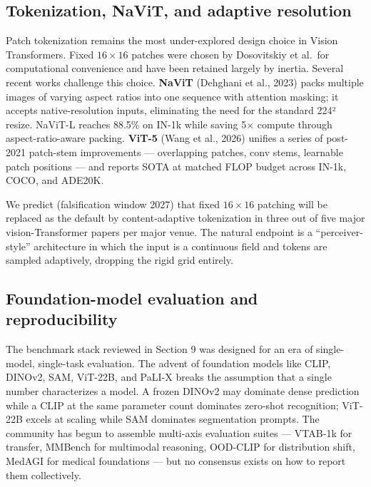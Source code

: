 \subsection{Tokenization, NaViT, and adaptive resolution}\label{tokenization-navit-and-adaptive-resolution}

Patch tokenization remains the most under-explored design choice in Vision Transformers. Fixed \(16 \times 16\) patches were chosen by Dosovitskiy et al.~for computational convenience and have been retained largely by inertia. Several recent works challenge this choice. \textbf{NaViT} (Dehghani et al., 2023) packs multiple images of varying aspect ratios into one sequence with attention masking; it accepts native-resolution inputs, eliminating the need for the standard 224² resize. NaViT-L reaches 88.5\% on IN-1k while saving 5× compute through aspect-ratio-aware packing. \textbf{ViT-5} (Wang et al., 2026) unifies a series of post-2021 patch-stem improvements --- overlapping patches, conv stems, learnable patch positions --- and reports SOTA at matched FLOP budget across IN-1k, COCO, and ADE20K.

We predict (falsification window 2027) that fixed \(16 \times 16\) patching will be replaced as the default by content-adaptive tokenization in three out of five major vision-Transformer papers per major venue. The natural endpoint is a ``perceiver-style'' architecture in which the input is a continuous field and tokens are sampled adaptively, dropping the rigid grid entirely.

\subsection{Foundation-model evaluation and reproducibility}\label{foundation-model-evaluation-and-reproducibility}

The benchmark stack reviewed in Section 9 was designed for an era of single-model, single-task evaluation. The advent of foundation models like CLIP, DINOv2, SAM, ViT-22B, and PaLI-X breaks the assumption that a single number characterizes a model. A frozen DINOv2 may dominate dense prediction while a CLIP at the same parameter count dominates zero-shot recognition; ViT-22B excels at scaling while SAM dominates segmentation prompts. The community has begun to assemble multi-axis evaluation suites --- VTAB-1k for transfer, MMBench for multimodal reasoning, OOD-CLIP for distribution shift, MedAGI for medical foundations --- but no consensus exists on how to report them collectively.

